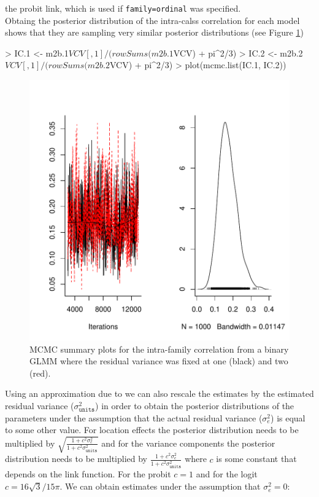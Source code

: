 \documentclass{article}
\begin{document}
the probit link, which is used if \texttt{family=ordinal} was specified.\\

Obtaing the posterior distribution of the intra-calss correlation for each model shows that they are sampling very similar posterior distributions (see Figure \ref{IC-fig}) 

\begin{Schunk}
\begin{Sinput}
> IC.1 <- m2b.1$VCV[, 1]/(rowSums(m2b.1$VCV) + pi^2/3)
> IC.2 <- m2b.2$VCV[, 1]/(rowSums(m2b.2$VCV) + pi^2/3)
> plot(mcmc.list(IC.1, IC.2))
\end{Sinput}
\end{Schunk}

\begin{figure}[!h]
\begin{center}
\includegraphics{Lecture2-070}
\end{center}
\caption{MCMC summary plots for the intra-family correlation from  a binary GLMM where the residual variance was fixed at one (black) and two (red).}
\label{IC-fig}
\end{figure}

Using an approximation due to \citet{Diggle.2004} we can also rescale the estimates by the estimated residual variance ($\sigma^{2}_{\texttt{units}}$) in order to obtain the posterior distributions of the parameters under the assumption that the actual residual variance ($\sigma^{2}_{e}$) is equal to some other value.  For location effects the posterior distribution needs to be multiplied by $\sqrt{\frac{1+c^{2}\sigma^{2}_{e}}{1+c^{2}\sigma^{2}_{\texttt{units}}}}$ and for the variance components the posterior distribution needs to be multiplied by $\frac{1+c^{2}\sigma^{2}_{e}}{1+c^{2}\sigma^{2}_{\texttt{units}}}$ where $c$ is some constant that depends on the link function. For the probit $c=1$ and for the logit $c=16\sqrt{3}/15\pi$. We can obtain estimates under the assumption that $\sigma^{2}_{e}=0$: 
\end{document}

